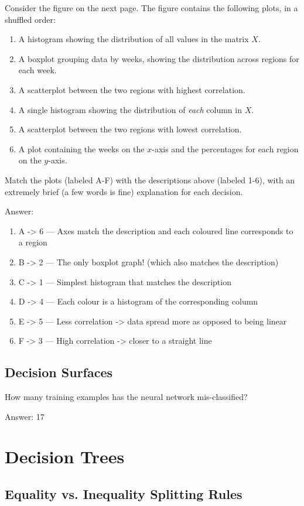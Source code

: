 \documentclass{article}
\def\ans#1{\par\gre{Answer: #1}}
\def\blu#1{{\color{blu}#1}}
\def\gre#1{{\color{gre}#1}}
\def\enum#1{\begin{enumerate}#1\end{enumerate}}
\begin{document}
Consider the figure on the next page.
The figure contains the following plots, in a shuffled order:
\enum{
\item A histogram showing the distribution of all values in the matrix $X$.
\item A boxplot grouping data by weeks, showing the distribution across regions for each week.
\item A scatterplot between the two regions with highest correlation.
\item A single histogram showing the distribution of \emph{each} column in $X$.
\item A scatterplot between the two regions with lowest correlation.
\item A plot containing the weeks on the $x$-axis and the percentages for each region on the $y$-axis.
}
\blu{Match the plots (labeled A-F) with the descriptions above (labeled 1-6), with an extremely brief (a few words is fine) explanation for each decision.}

\ans{
	\begin{enumerate}
		\item A -> 6 --- Axes match the description and each coloured line corresponds to a region
		\item B -> 2 --- The only boxplot graph! (which also matches the description)
		\item C -> 1 --- Simplest histogram that matches the description
		\item D -> 4 --- Each colour is a histogram of the corresponding column
		\item E -> 5 --- Less correlation -> data spread more as opposed to being linear
		\item F -> 3 --- High correlation -> closer to a straight line
	\end{enumerate}
}

\subsection{Decision Surfaces}

\blu{How many training examples has the neural network mis-classified?}
\ans{
	17
}


\section{Decision Trees}

\subsection{Equality vs. Inequality Splitting Rules}
\end{document}

